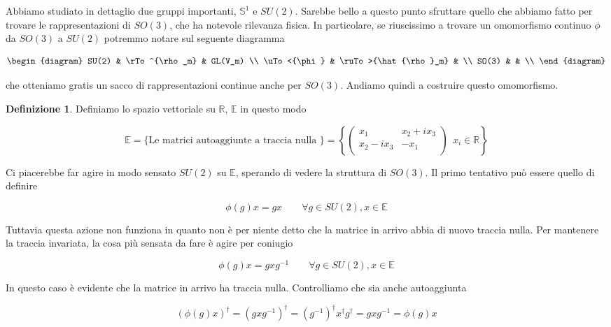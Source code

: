 \documentclass[11pt]{article}
\theoremstyle{plain}
\theoremstyle{definition}
\newtheorem{defn}{Definizione}[section]
\theoremstyle{remark}
\newcommand{\R}{\mathbb{R}}
\begin{document}
 Abbiamo studiato in dettaglio due gruppi importanti, $\mathbb{S}^1$ e $SU(2)$. Sarebbe bello a questo punto sfruttare quello che abbiamo fatto per trovare le rappresentazioni di $SO(3)$, che ha notevole rilevanza fisica. In particolare, se riuscissimo a trovare un omomorfismo continuo $\phi$ da $SO(3)$ a $SU(2)$ potremmo notare sul seguente diagramma

 \[
 \begin{diagram}
   SU(2)       & \rTo^{\rho_m}        & GL(V_m) \\
   \uTo<{\phi} & \ruTo>{\hat{\rho}_m} & \\
   SO(3)       &                      & \\
 \end{diagram}
 \]

 \noindent che otteniamo gratis un sacco di rappresentazioni continue anche per $SO(3)$. Andiamo quindi a costruire questo omomorfismo.

 \begin{defn}
   Definiamo lo spazio vettoriale su $\R$, $\mathbb{E}$ in questo modo

   \[ \mathbb{E } = \{ \text{Le matrici autoaggiunte a traccia nulla }\} = \left\{
   \left(
   \begin{array}{cc}
     x_1 & x_2 + i x_3 \\
     x_2 - i x_3 & -x_1 \\
   \end{array}
   \right)
   \  \  x_i \in \R
   \right\}\]

 \end{defn}

 Ci piacerebbe far agire in modo sensato $SU(2)$ su $\mathbb{E}$, sperando di vedere la struttura di $SO(3)$. Il primo tentativo può essere quello di definire

 \[ \phi(g) x = gx \qquad \forall g \in SU(2) , x \in \mathbb{E}\]

 Tuttavia questa azione non funziona in quanto non è per niente detto che la matrice in arrivo abbia di nuovo traccia nulla. Per mantenere la traccia invariata, la cosa più sensata da fare è agire per coniugio

 \[ \phi(g) x = gxg^{-1} \qquad \forall g \in SU(2) , x \in \mathbb{E}\]

 In questo caso è evidente che la matrice in arrivo ha traccia nulla. Controlliamo che sia anche autoaggiunta

 \[ \left( \phi(g) x \right)^\dag = \left( g x g^{-1}\right)^\dag = (g^{-1})^\dag x^\dag g ^\dag = g x g^{-1} = \phi(g) x\]
\end{document}
